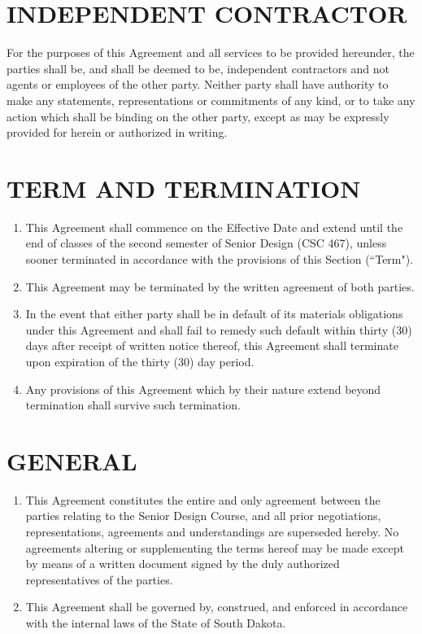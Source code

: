 \documentclass[11pt]{article}
\begin{document}
\section{INDEPENDENT CONTRACTOR}  

For the purposes of this Agreement and all services to be provided hereunder, the parties shall be, and shall be deemed to be, independent contractors and not agents or employees of the other party. Neither party shall have authority to make any statements, representations or commitments of any kind, or to take any action which shall be binding on the other party, except as may be expressly provided for herein or authorized in writing.  

\section{TERM AND TERMINATION }    
\begin{enumerate}  \itemsep4pt \parskip0pt 
\item This Agreement shall commence on the Effective Date and extend until the end of classes of the second semester of Senior Design (CSC 467), unless sooner terminated in accordance with the provisions of this Section (``Term"). 

\item This Agreement may be terminated by the written agreement of both       parties.    

\item In the event that either party shall be in default of its       materials obligations under this Agreement and shall fail to       remedy such default within thirty (30) days after receipt of       written notice thereof, this Agreement shall terminate upon       expiration of the thirty (30) day period.    

\item Any provisions of this Agreement which by their nature extend       beyond termination shall survive such termination.  
\end{enumerate}


\section{GENERAL }    
\begin{enumerate}  \itemsep4pt \parskip0pt 
\item This Agreement constitutes the entire and only agreement between       the parties relating to the Senior Design Course, and all prior       negotiations, representations, agreements and understandings are       superseded hereby. No agreements altering or supplementing the       terms hereof may be made except by means of a written document       signed by the duly authorized representatives of the parties.    

\item This Agreement shall be governed by, construed, and enforced in       accordance with the internal laws of the State of South Dakota. 
\end{enumerate}
\end{document}
